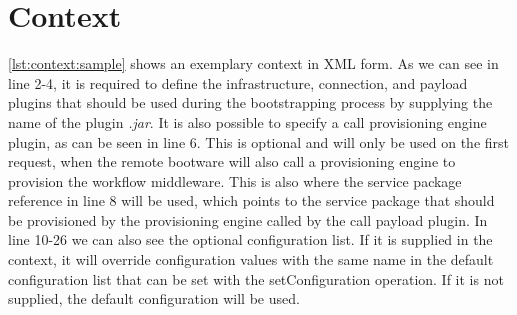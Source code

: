 \section{Context}
\label{implementation:context}

\vspace*{\baselineskip}

\autoref{lst:context:sample} shows an exemplary context in XML form.
As we can see in line 2-4, it is required to define the infrastructure, connection, and payload plugins that should be used during the bootstrapping process by supplying the name of the plugin \textit{.jar}.
It is also possible to specify a call provisioning engine plugin, as can be seen in line 6.
This is optional and will only be used on the first request, when the remote bootware will also call a provisioning engine to provision the workflow middleware.
This is also where the service package reference in line 8 will be used, which points to the service package that should be provisioned by the provisioning engine called by the call payload plugin.
In line 10-26 we can also see the optional configuration list.
If it is supplied in the context, it will override configuration values with the same name in the default configuration list that can be set with the setConfiguration operation.
If it is not supplied, the default configuration will be used.
